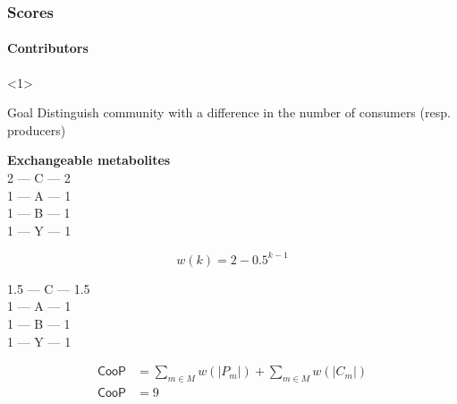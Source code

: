 \documentclass[8pt]{beamer}
\begin{document}
\begin{frame}[fragile]
\frametitle{Scores}
\framesubtitle{Contributors}
\begin{onlyenv}<1>
\begin{minipage}{0.5\textwidth}
\vspace{-1cm}
\begin{block}{Goal}
Distinguish community with a difference in the number of consumers (resp. producers)
\end{block}
\textbf{Exchangeable metabolites}\\
2 --- C --- 2\\
1 --- A --- 1\\
1 --- B --- 1\\
1 --- Y --- 1

\[
w(k) = 2-{0.5^{k-1}}
\]

1.5 --- C --- 1.5\\
1 --- A --- 1\\
1 --- B --- 1\\
1 --- Y --- 1

\[
\begin{split}
    \textsf{CooP} &= \sum_{m\in M} w(|P_m|) + \sum_{m\in M} w(|C_m|)\\
     \textsf{CooP} &=  9
\end{split}
\]



\end{minipage}
\end{onlyenv}
\end{frame}
\end{document}
